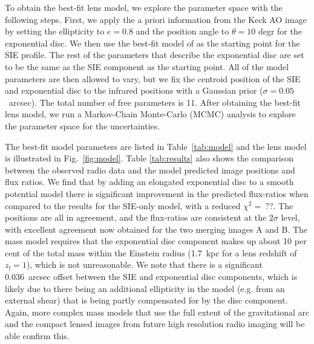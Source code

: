 \documentclass[a4paper,fleqn,usenatbib,useAMS]{mnras}
\begin{document}
To obtain the best-fit lens model, we explore the parameter space with the following steps. First, we apply the a priori information from the Keck AO image by setting the ellipticity to $e=0.8$ and the position angle to $\theta=10$ degr for the exponential disc. We then use the best-fit model of \citet{Marlow99} as the starting point for the SIE profile. The rest of the parameters that describe the exponential disc are set to be the same as the SIE component as the starting point. All of the model parameters are then allowed to vary, but we fix the centroid position of the SIE and exponential disc to the infrared positions with a Gaussian prior ($\sigma = 0.05 $~arcsec). The total number of free parameters is 11. After obtaining the best-fit lens model, we run a Markov-Chain Monte-Carlo (MCMC) analysis to explore the parameter space for the uncertainties.

The best-fit model parameters are listed in Table~\ref{tab:model} and the lens model is illustrated in Fig.~\ref{fig:model}. Table \ref{tab:results} also shows the comparison between the observed radio data and the model predicted image positions and flux ratios. We find that by adding an elongated exponential disc to a smooth potential model there is significant improvement in the predicted flux-ratios when compared to the results for the SIE-only model, with a reduced $\chi^2 = ~??$. The positions are all in agreement, and the flux-ratios are consistent at the $2\sigma$ level, with excellent agreement now obtained for the two merging images A and B. The mass model requires that the exponential disc component makes up about 10 per cent of the total mass within the Einstein radius (1.7~kpc for a lens redshift of $z_l = 1$), which is not unreasonable. We note that there is a significant 0.036~arcsec offset between the SIE and exponential disc components, which is likely due to there being an additional ellipticity in the model (e.g. from an external shear) that is being partly compensated for by the disc component. Again, more complex mass models that use the full extent of the gravitational arc and the compact lensed images from future high resolution radio imaging will be able confirm this.
\end{document}

